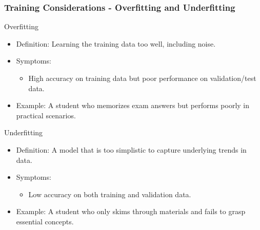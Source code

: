 \documentclass[aspectratio=169]{beamer}
\begin{document}
\begin{frame}[fragile]
  \frametitle{Training Considerations - Overfitting and Underfitting}
  \begin{block}{Overfitting}
    \begin{itemize}
      \item Definition: Learning the training data too well, including noise.
      \item Symptoms:
        \begin{itemize}
          \item High accuracy on training data but poor performance on validation/test data.
        \end{itemize}
      \item Example: A student who memorizes exam answers but performs poorly in practical scenarios.
    \end{itemize}
  \end{block}

  \begin{block}{Underfitting}
    \begin{itemize}
      \item Definition: A model that is too simplistic to capture underlying trends in data.
      \item Symptoms:
        \begin{itemize}
          \item Low accuracy on both training and validation data.
        \end{itemize}
      \item Example: A student who only skims through materials and fails to grasp essential concepts.
    \end{itemize}
  \end{block}
\end{frame}
\end{document}
